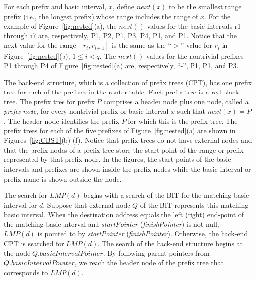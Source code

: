 For each prefix and basic interval, $x$, define $next(x)$
to be the smallest range prefix (i.e., the longest prefix)
whose range includes the range of $x$.
For the example of Figure~\ref{fig:nested}(a), the $next()$ values for the
basic intervals r1 through r7 are, respectively, P1, P2, P1, P3, P4, P1, and P1.
Notice that the next value for the range $[r_i, r_{i+1}]$ is the same as the
``$>$'' value for $r_i$ in Figure~\ref{fig:nested}(b), $1 \leq i < q$.
The $next()$ values for the nontrivial
prefixes P1 through P4 of Figure~\ref{fig:nested}(a)
are, respectively, ``-'', P1, P1, and P3.
%


The back-end structure, which is a collection of prefix trees (CPT),
has one prefix tree for each of the prefixes in the router table.
Each prefix tree is a red-black tree.
The prefix tree for prefix $P$ comprises a header node plus one node,
called a {\em prefix node},
for every nontrivial prefix or basic interval $x$ such that $next(x) = P$.
The header node identifies the prefix $P$ for which this is the prefix tree.
The prefix trees for each of the five prefixes of Figure~\ref{fig:nested}(a)
are shown in Figures~\ref{fig:CBST}(b)-(f).
Notice that prefix trees do not have external nodes and that the prefix
nodes of a prefix tree store the start point of the range or prefix
represented by that prefix node. In the figures, the start points of the
basic intervals and prefixes are shown inside the prefix nodes while
the basic interval or prefix name is shown outside the node.

The search for $LMP(d)$ begins with a search of the BIT for the
matching basic interval
for $d$. Suppose that external node $Q$ of the BIT represents this
matching basic interval.
When the destination address equals the left (right) end-point of the matching
basic interval and {\em startPointer} ({\em finishPointer})
is not null, $LMP(d)$ is pointed to by {\em startPointer} ({\em finishPointer}).
Otherwise,
the back-end CPT
is searched for $LMP(d)$.
The search of the back-end structure begins at the node
$Q.basicIntervalPointer$.
By following parent pointers
from $Q.basicIntervalPointer$, we reach the header node of the prefix tree
that corresponds to $LMP(d)$.

